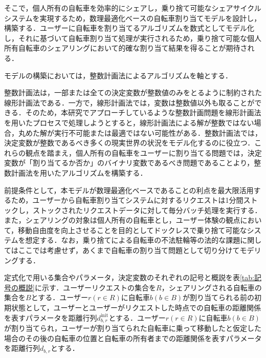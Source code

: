       \par そこで，個人所有の自転車を効率的にシェアし，乗り捨て可能なシェアサイクルシステムを実現するため，数理最適化ベースの自転車割り当てモデルを設計し，構築する．ユーザーに自転車を割り当てるアルゴリズムを数式としてモデル化し，それに基づいて自転車割り当て処理が実行されるため，乗り捨て可能な個人所有自転車のシェアリングにおいて的確な割り当て結果を得ることが期待される．
          
      \par モデルの構築においては，整数計画法によるアルゴリズムを軸とする．
          
      \par 整数計画法は，一部または全ての決定変数が整数値のみをとるように制約された線形計画法である\cite{wolsey2020integer}．一方で，線形計画法では，変数は整数値以外も取ることができる．そのため，本研究でアプローチしているような整数計画問題を線形計画法を用いたプロセスで処理しようとすると，線形計画法による解が整数ではない場合，丸めた解が実行不可能または最適ではない可能性がある\cite{hooker2024integer}．整数計画法では，決定変数が整数であるべき多くの現実世界の状況をモデル化するのに役立つ\cite{gomory1960integer}．これらの観点を踏まえ，個人所有の自転車をユーザーに割り当てる問題では，決定変数が「割り当てるか否か」のバイナリ変数であるべき問題であることより，整数計画法を用いたアルゴリズムを構築する．
          
      \par 前提条件として，本モデルが数理最適化ベースであることの利点を最大限活用するため，ユーザーから自転車割り当てシステムに対するリクエストは1分間ストックし，ストックされたリクエストデータに対して毎分バッチ処理を実行する．また，シェアリングの対象は個人所有の自転車とし，ユーザー体験の観点において，移動自由度を向上させることを目的としてドックレスで乗り捨て可能なシステムを想定する．なお，乗り捨てによる自転車の不法駐輪等の法的な課題に関してはここでは考慮せず，あくまで自転車の割り当て問題として切り分けてモデリングする．
          
      \par 定式化で用いる集合やパラメータ，決定変数のそれぞれの記号と概説を表\ref{tab:記号の概説}に示す．ユーザーリクエストの集合を$R$，シェアリングされる自転車の集合を$B$とする．ユーザー$r (r \in R)$に自転車$b (b \in B)$が割り当てられる前の初期状態として，ユーザーとユーザーがリクエストした時点での自転車の距離関係を表すパラメータを距離行列$d^{\text{init}}_{b,r}$とする．ユーザー$r (r \in R)$に自転車$b (b \in B)$が割り当てられ，ユーザーが割り当てられた自転車に乗って移動したと仮定した場合のその後の自転車の位置と自転車の所有者までの距離関係を表すパラメータを距離行列$d_{b,r}$とする．
          
